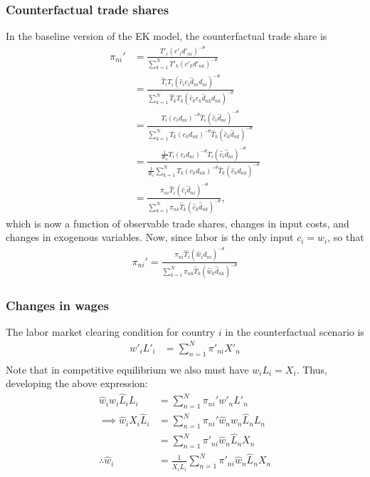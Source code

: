 \documentclass[12pt]{article}
\begin{document}
\subsubsection{Counterfactual trade shares}
In the baseline version of the EK model, the counterfactual trade share is
\begin{align*}
\pi_{ni}' &= \frac{T'_i(c'_id'_{ni})^{-\theta} }{\sum_{k=1}^N T'_k(c'_kd'_{nk})^{-\theta}}\\
&=\frac{\hat T_i T_i(\hat c_i c_i \hat d_{ni} d_{ni})^{-\theta} }{\sum_{k=1}^N \hat T_k T_k(\hat c_k c_k \hat d_{nk} d_{nk})^{-\theta}}\\
&=\frac{T_i(c_id_{ni})^{-\theta}\hat T_i(\hat c_i\hat d_{ni})^{-\theta}  }{\sum_{k=1}^N T_k(c_kd_{nk})^{-\theta}\hat T_k(\hat c_k \hat d_{nk})^{-\theta}}\\
&=\frac{\frac{1}{\Phi_n}T_i(c_id_{ni})^{-\theta}\hat T_i(\hat c_i\hat d_{ni})^{-\theta}  }{\frac{1}{\Phi_n}\sum_{k=1}^N T_k(c_kd_{nk})^{-\theta}\hat T_k(\hat c_k \hat d_{nk})^{-\theta}}\\
&=\frac{\pi_{ni}\hat T_i(\hat c_i\hat d_{ni})^{-\theta}  }{\sum_{k=1}^N\pi_{nk}\hat T_k(\hat c_k \hat d_{nk})^{-\theta}},
\end{align*}
which is now a function of observable trade shares, changes in input costs, and changes in exogenous variables. Now, since labor is the only input $c_i = w_i$, so that 
\begin{align}
\pi_{ni}' = \frac{\pi_{ni}\hat T_i(\hat w_i\hat d_{ni})^{-\theta}  }{\sum_{k=1}^N\pi_{nk}\hat T_k(\hat w_k \hat d_{nk})^{-\theta}} \label{eq:EKcf1}
\end{align}

\subsubsection{Changes in wages}
The labor market clearing condition for country $i$ in the counterfactual scenario is
\begin{align*}
w'_i L'_i &= \sum_{n=1}^N \pi'_{ni}X'_n\\
\end{align*}
Note that in competitive equilibrium we also must have $w_i L_i = X_i$. Thus, developing the above expression:
\begin{align}
 \hat w_i w_i \hat L_i L_i &= \sum_{n=1}^N \pi_{ni}' w'_n L'_n \nonumber \\
 \implies \hat w_i  X_i\hat L_i &= \sum_{n=1}^N\pi_{ni}' \hat w_n w_n \hat L_n L_n \nonumber\\
 &=\sum_{n=1}^N \pi'_{ni} \hat w_n \hat L_n X_n \nonumber\\
 \therefore \hat w_i &= \frac{1}{X_i\hat L_i} \sum_{n=1}^N \pi'_{ni} \hat w_n \hat L_n X_n \label{eq:EKcf2}
\end{align}
\end{document}
